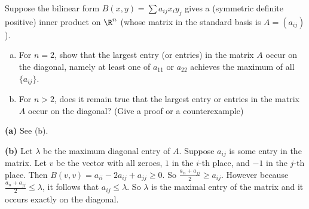 \begin{problem}
Suppose the bilinear form $B(x,y)=\sum a_{ij} x_i y_j$ gives a (symmetric definite positive) inner product on $\R^n$ (whose matrix in the standard basis is $A=(a_{ij})$). 
\begin{enumerate}[(a)]
  \item For $n=2$, show that the largest entry (or entries) in the matrix $A$ occur on the diagonal, namely at least one of $a_{11}$ or $a_{22}$ achieves the maximum of all $\{a_{ij}\}$.
  \item For $n>2$, does it remain true that the largest entry or entries in the matrix $A$ occur on the diagonal? (Give a proof or a counterexample)
\end{enumerate}
\end{problem}

\textbf{(a)} See (b).

\textbf{(b)} Let $\lambda$ be the maximum diagonal entry of $A$. Suppose $a_{ij}$ is some entry in the matrix. Let $v$ be the vector with all zeroes, $1$ in the $i$-th place, and $-1$ in the $j$-th place. Then $B(v,v)=a_{ii}-2a_{ij}+a_{jj}\geq 0$. So $\frac{a_{ii}+a_{jj}}{2}\geq a_{ij}$. However because $\frac{a_{ii}+a_{jj}}{2}\leq \lambda$, it follows that $a_{ij}\leq \lambda$. So $\lambda$ is the maximal entry of the matrix and it occurs exactly on the diagonal.   